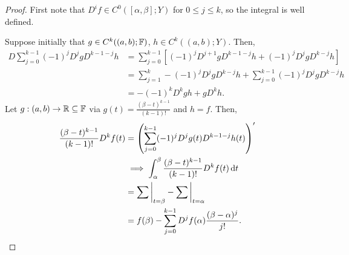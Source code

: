 \documentclass{report}
\begin{document}
\begin{proof}
    First note that $D^if \in C^0([\alpha, \beta]; Y)$ for $0 \leq j \leq k$, so the integral is well defined.

    Suppose initially that $g \in C^k((a, b); \FF)$, $h \in C^k((a, b); Y)$. Then,
    \begin{align*}
        D \sum_{j=0}^{k-1} (-1)^j D^{j} g D^{k-1 - j} h &= \sum_{j=0}^{k-1} [(-1)^j D^{j+1} g D^{k-1-j} h + (-1)^j D^jg D^{k-j} h] \\
        &= \sum_{j=1}^k -(-1)^j D^jg D^{k-j}h + \sum_{j=0}^{k-1}(-1)^j D^jg D^{k-j}h \\
        &= -(-1)^k D^k g h + gD^k h.
    \end{align*}
    Let $g: (a,b) \to \RR \subseteq \FF$ via $g(t) = \frac{(\beta - t)^{k-1}}{(k-1)!}$ and $h =f$. Then,
    \begin{align*}
        \frac{(\beta - t)^{k-1}}{(k-1)!} D^kf(t) &= \left(\sum_{j=0}^{k-1} (-1)^j D^j g(t) D^{k-1-j} h(t) \right)' \\
        &\implies \int_\alpha^\beta \frac{(\beta - t)^{k-1}}{(k-1)!} D^kf(t) \, \text dt \\
        &= \sum \bigg |_{t =\beta} - \sum \bigg|_{t = \alpha} \\
        &= f(\beta) - \sum_{j=0}^{k-1} D^jf(\alpha) \frac{(\beta - \alpha)^j}{j!}.
    \end{align*}
\end{proof}
\newpage
{}
\end{document}
